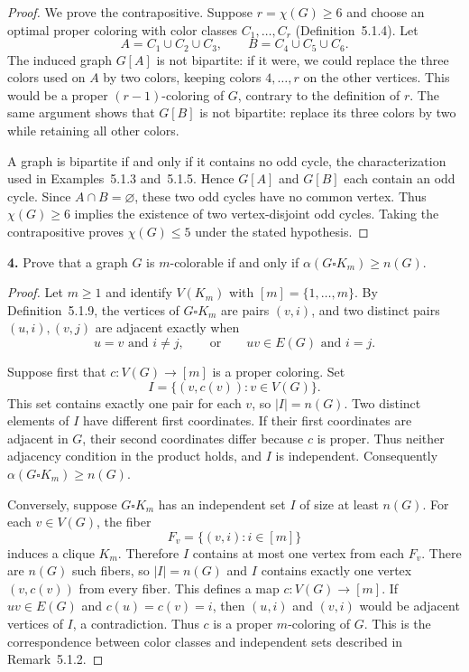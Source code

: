 \documentclass[12pt]{amsart}
\theoremstyle{conjecture}
\theoremstyle{definition}
\theoremstyle{question}
\theoremstyle{theorem}
\begin{document}
    \begin{proof}
        We prove the contrapositive.  Suppose $r=\chi(G)\geq6$ and choose an
        optimal proper coloring with color classes $C_1,\ldots,C_r$
        (Definition~5.1.4).  Let
        \[
            A=C_1\cup C_2\cup C_3,
            \qquad B=C_4\cup C_5\cup C_6.
        \]
        The induced graph $G[A]$ is not bipartite: if it were, we could replace
        the three colors used on $A$ by two colors, keeping colors
        $4,\ldots,r$ on the other vertices.  This would be a proper
        $(r-1)$-coloring of $G$, contrary to the definition of $r$.
        The same argument shows that $G[B]$ is not bipartite: replace its
        three colors by two while retaining all other colors.

        A graph is bipartite if and only if it contains no odd cycle, the
        characterization used in Examples~5.1.3 and~5.1.5.  Hence $G[A]$ and
        $G[B]$ each contain an odd cycle.  Since $A\cap B=\varnothing$, these
        two odd cycles have no common vertex.  Thus $\chi(G)\geq6$ implies
        the existence of two vertex-disjoint odd cycles.  Taking the
        contrapositive proves $\chi(G)\leq5$ under the stated hypothesis.
    \end{proof}

    \noindent\textbf{4.} Prove that a graph $G$ is $m$-colorable if and only if
    $\alpha(G\square K_m) \ge n(G)$.

    \begin{proof}
        Let $m\geq1$ and identify $V(K_m)$ with $[m]=\{1,\ldots,m\}$.
        By Definition~5.1.9, the vertices of $G\square K_m$ are pairs $(v,i)$,
        and two distinct pairs $(u,i),(v,j)$ are adjacent exactly when
        \[
            u=v\text{ and }i\ne j,
            \qquad\text{or}\qquad
            uv\in E(G)\text{ and }i=j.
        \]

        Suppose first that $c:V(G)\to[m]$ is a proper coloring.  Set
        \[
            I=\{(v,c(v)):v\in V(G)\}.
        \]
        This set contains exactly one pair for each $v$, so $|I|=n(G)$.
        Two distinct elements of $I$ have different first coordinates.
        If their first coordinates are adjacent in $G$, their second
        coordinates differ because $c$ is proper.  Thus neither adjacency
        condition in the product holds, and $I$ is independent.  Consequently
        $\alpha(G\square K_m)\geq n(G)$.

        Conversely, suppose $G\square K_m$ has an independent set $I$ of
        size at least $n(G)$.  For each $v\in V(G)$, the fiber
        \[
            F_v=\{(v,i):i\in[m]\}
        \]
        induces a clique $K_m$.  Therefore $I$ contains at most one vertex
        from each $F_v$.  There are $n(G)$ such fibers, so $|I|=n(G)$ and
        $I$ contains exactly one vertex $(v,c(v))$ from every fiber.
        This defines a map $c:V(G)\to[m]$.  If $uv\in E(G)$ and
        $c(u)=c(v)=i$, then $(u,i)$ and $(v,i)$ would be adjacent vertices
        of $I$, a contradiction.  Thus $c$ is a proper $m$-coloring of $G$.
        This is the correspondence between color classes and independent
        sets described in Remark~5.1.2.
    \end{proof}
\end{document}
